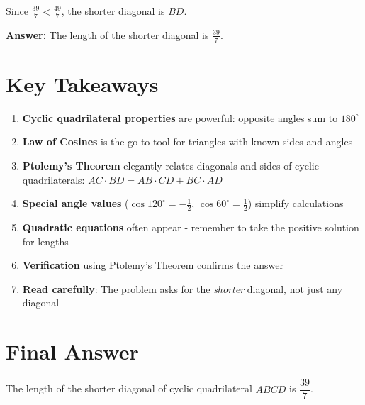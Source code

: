 \documentclass[11pt]{article}
\begin{document}
Since $\frac{39}{7} < \frac{49}{7}$, the shorter diagonal is $BD$.

\vspace{0.3cm}

\textbf{Answer:} The length of the shorter diagonal is $\boxed{\frac{39}{7}}$.

\section*{Key Takeaways}

\begin{enumerate}
    \item \textbf{Cyclic quadrilateral properties} are powerful: opposite angles sum to $180^\circ$
    \item \textbf{Law of Cosines} is the go-to tool for triangles with known sides and angles
    \item \textbf{Ptolemy's Theorem} elegantly relates diagonals and sides of cyclic quadrilaterals: $AC \cdot BD = AB \cdot CD + BC \cdot AD$
    \item \textbf{Special angle values} ($\cos 120^\circ = -\frac{1}{2}$, $\cos 60^\circ = \frac{1}{2}$) simplify calculations
    \item \textbf{Quadratic equations} often appear - remember to take the positive solution for lengths
    \item \textbf{Verification} using Ptolemy's Theorem confirms the answer
    \item \textbf{Read carefully}: The problem asks for the \emph{shorter} diagonal, not just any diagonal
\end{enumerate}

\section*{Final Answer}

The length of the shorter diagonal of cyclic quadrilateral $ABCD$ is $\dfrac{39}{7}$.

\begin{center}
\end{center}
\end{document}
